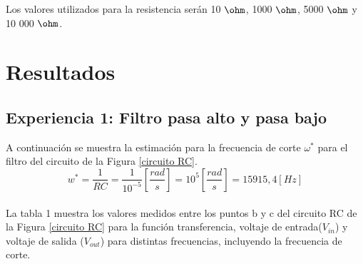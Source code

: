 \documentclass[letterpaper,11pt]{article} %
\begin{document}
Los valores utilizados para la resistencia serán 10 $\ohm$, 1000 $\ohm$, 5000 $\ohm$ y 10 000 $\ohm$.



\newpage
\section{Resultados}
\subsection{Experiencia 1: Filtro pasa alto y pasa bajo}

A continuación se muestra la estimación para la frecuencia de corte $\omega^*$ para el filtro del circuito de la Figura \ref{circuito RC}. \\
$$w^*=\frac{1}{RC}=\frac{1}{10^{-5}}[\frac{rad}{s}]=10^5 [\frac{rad}{s}]=15915,4 [Hz]$$ \\
La tabla 1 muestra los valores medidos entre los puntos b y c del circuito RC de la Figura \ref{circuito RC} para la función transferencia, voltaje de entrada($V_{in}$) y voltaje de salida ($V_{out}$) para distintas frecuencias, incluyendo la frecuencia de corte.
\end{document}
